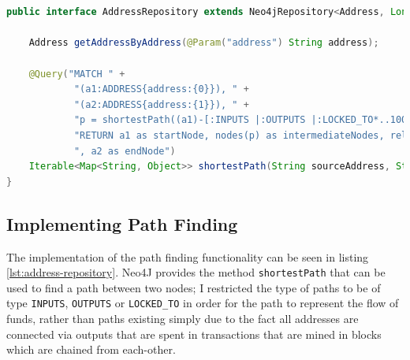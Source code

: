 \begin{lstlisting}[language=Java, label={lst:address-repository}, caption={AddressRepository interface definition}, breaklines=true, basicstyle=\small]


public interface AddressRepository extends Neo4jRepository<Address, Long> {

    Address getAddressByAddress(@Param("address") String address);

    @Query("MATCH " +
            "(a1:ADDRESS{address:{0}}), " +
            "(a2:ADDRESS{address:{1}}), " +
            "p = shortestPath((a1)-[:INPUTS |:OUTPUTS |:LOCKED_TO*..100]-(a2)) " +
            "RETURN a1 as startNode, nodes(p) as intermediateNodes, relationships(p) as rels" +
            ", a2 as endNode")
    Iterable<Map<String, Object>> shortestPath(String sourceAddress, String destinationAddress);
}
\end{lstlisting}

\subsection{Implementing Path Finding}
The implementation of the path finding functionality can be seen in listing \ref{lst:address-repository}. Neo4J provides the method \texttt{shortestPath} that can be used to find a path between two nodes; I restricted the type of paths to be of type \texttt{INPUTS}, \texttt{OUTPUTS} or \texttt{LOCKED\_TO} in order for the path to represent the flow of funds, rather than paths existing simply due to the fact all addresses are connected via outputs that are spent in transactions that are mined in blocks which are chained from each-other.




